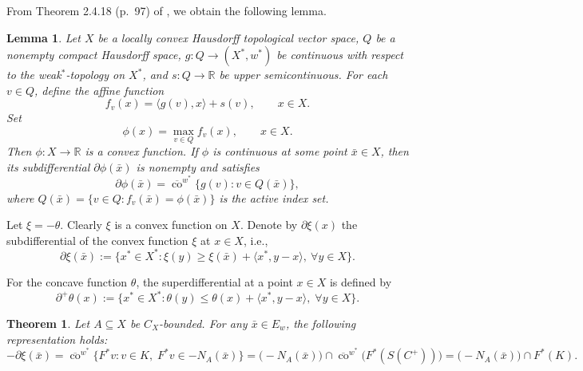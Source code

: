 \documentclass[11pt]{article}
\newtheorem{theorem}{Theorem}[section]
\newtheorem{lemma}{Lemma}[section]
\begin{document}
 

From  Theorem 2.4.18 (p.~97) of \cite{Zalinescu2002}, we obtain the following lemma.

 



\begin{lemma}\label{ITDL}
	Let   $X$ be a locally convex Hausdorff topological vector space,  $Q$ be a nonempty compact Hausdorff space,  $g: Q \to (X^*, w^*)$ be continuous with respect to the weak$^*$-topology on $X^*$,  and $s: Q \to \mathbb{R}$ be upper semicontinuous.
 	For each $v \in Q$, define the affine function
	\[
	f_v(x) = \langle g(v), x \rangle + s(v), \qquad x \in X.
	\]
	Set
	\[
	\phi(x) = \max_{v \in Q} f_v(x), \qquad x \in X.
	\]
	Then $\phi: X \to \mathbb{R}$ is a convex function.  If $\phi$ is continuous at some point $\bar x \in X$, then its subdifferential $\partial \phi(\bar x)$ is nonempty and satisfies
	\[
	\partial \phi(\bar x) = \overline{\operatorname{co}}^{w^*} \{ g(v) : v \in Q(\bar x) \},
	\]
	where $Q(\bar x) = \{ v \in Q : f_v(\bar x) = \phi(\bar x) \}$ is the active index set.
\end{lemma}




Let $\xi = -\theta$. Clearly $\xi$ is a convex   function on $X$.  Denote by $\partial \xi({x})$ the subdifferential of the convex function $\xi$ at $x \in X $, i.e.,
\[
\partial \xi(\bar{x}) := \big\{ x^* \in X^* : \xi(y) \ge \xi(\bar{x}) + \langle x^*, y - x \rangle,\ \forall y \in X \big\}.
\]

For the concave function \(\theta\), the superdifferential at a point \(x\in X\) is defined by
\[
\partial^+ \theta(x):=\{x^*\in X^*:\theta(y)\le\theta(x)+\langle x^*,y-x\rangle, \; \forall y\in X\}.
\]

\begin{theorem}  \label{BSXEQ}  Let $A  \subseteq X$ be $C_X$-bounded.
 For any $\bar{x} \in E_w$, the following representation holds:
	\[
	-\partial \xi(\bar{x}) = \overline{\operatorname{co}}^{w^*} \bigl\{ F^*v : v \in K,\; F^*v \in -N_A(\bar{x}) \bigr\} = \bigl( -N_A(\bar{x}) \bigr) \cap \overline{\operatorname{co}}^{w^*} \bigl( F^*(S(C^+)) \bigr) = \bigl( -N_A(\bar{x}) \bigr) \cap F^*(K).
	\]
\end{theorem}
\end{document}
